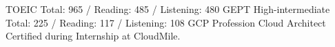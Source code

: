 



\begin{cvskills}

      \cvskill
        {TOEIC} %
        {Total: 965 / Reading: 485 / Listening: 480} %
      \cvskill
        {GEPT High-intermediate} %
        {Total: 225 / Reading: 117 / Listening: 108} %
     \cvskill
        {GCP Profession Cloud Architect}
        {Certified during Internship at CloudMile.}
    
    
    
\end{cvskills}